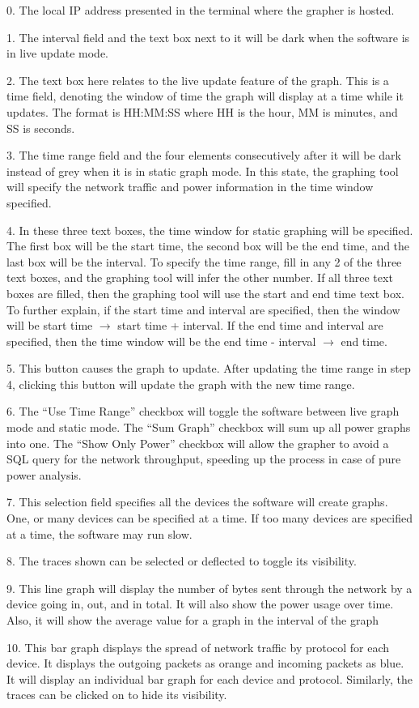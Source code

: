 0. The local IP address presented in the terminal where the grapher is hosted.

1. The interval field and the text box next to it will be dark when the software is in live update mode.

2. The text box here relates to the live update feature of the graph. This is a time field, denoting the window of time the graph will display at a time while it updates. The format is HH:MM:SS where HH is the hour, MM is minutes, and SS is seconds.

3. The time range field and the four elements consecutively after it will be dark instead of grey when it is in static graph mode. In this state, the graphing tool will specify the network traffic and power information in the time window specified.

4. In these three text boxes, the time window for static graphing will be specified. The first box will be the start time, the second box will be the end time, and the last box will be the interval. To specify the time range, fill in any 2 of the three text boxes, and the graphing tool will infer the other number. If all three text boxes are filled, then the graphing tool will use the start and end time text box. To further explain, if the start time and interval are specified, then the window will be start time $\rightarrow$ start time + interval. If the end time and interval are specified, then the time window will be the end time - interval $\rightarrow$ end time.

5. This button causes the graph to update. After updating the time range in step 4, clicking this button will update the graph with the new time range.

6. The ``Use Time Range'' checkbox will toggle the software between live graph mode and static mode. The ``Sum Graph'' checkbox will sum up all power graphs into one. The ``Show Only Power'' checkbox will allow the grapher to avoid a SQL query for the network throughput, speeding up the process in case of pure power analysis.

7. This selection field specifies all the devices the software will create graphs. One, or many devices can be specified at a time. If too many devices are specified at a time, the software may run slow.

8. The traces shown can be selected or deflected to toggle its visibility.

9. This line graph will display the number of bytes sent through the network by a device going in, out, and in total. It will also show the power usage over time. Also, it will show the average value for a graph in the interval of the graph

10. This bar graph displays the spread of network traffic by protocol for each device. It displays the outgoing packets as orange and incoming packets as blue. It will display an individual bar graph for each device and protocol. Similarly, the traces can be clicked on to hide its visibility.
